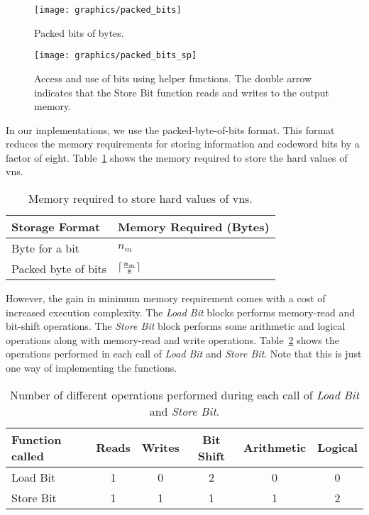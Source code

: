 \begin{enumerate}
  \begin{figure}[htbp]
    \centering
    \texttt{[image: graphics/packed\_bits]}
    \caption[Illustration of Packed-byte-of-bits storage format.]{Packed bits of bytes.}
    \label{fig:packed_bits}
  \end{figure}
  \begin{figure}[htbp]
    \centering
    \texttt{[image: graphics/packed\_bits\_sp]}
    \caption[Usage of bits stored in Packed-byte-of-bits format.]{Access and use of bits using helper functions. The double arrow indicates that the Store Bit function reads and writes to the output memory.}
    \label{fig:packed_spb}
  \end{figure}
\end{enumerate}
In our implementations, we use the packed-byte-of-bits format. This format reduces the memory requirements for storing information and codeword bits by a factor of eight. Table~\ref{tab:mem_req} shows the memory required to store the hard values of \glspl{vn}.
\begin{table}[htbp]
  \centering
  \begin{tabular}{|l|l|}
    \hline
    \textbf{Storage Format} &\textbf{Memory Required (Bytes)}\\
    \hline
    \hline
    Byte for a bit &$n_m$\\
    \hline
    Packed byte of bits &$\lceil\frac{n_m}{8}\rceil$\\
    \hline
  \end{tabular}
  \caption{Memory required to store hard values of \glspl{vn}.}
  \label{tab:mem_req}
\end{table}

However, the gain in minimum memory requirement comes with a cost of increased execution complexity. The \emph{Load Bit} blocks performs memory-read and bit-shift operations. The \emph{Store Bit} block performs some arithmetic and logical operations along with memory-read and write operations. Table~\ref{tab:load_store} shows the operations performed in each call of \emph{Load Bit} and \emph{Store Bit}. Note that this is just one way of implementing the functions.
\begin{table}[htbp]
  \centering
  \begin{tabular}{|l|c|c|c|c|c|}
    \hline
    \textbf{Function called} &\textbf{Reads} &\textbf{Writes} &\textbf{Bit Shift} &\textbf{Arithmetic} &\textbf{Logical}\\
    \hline
    \hline
    Load Bit &1 &0 &2 &0 &0\\
    \hline
    Store Bit &1 &1 &1 &1 &2\\
    \hline
  \end{tabular}
  \caption[Operations performed for different storage formats.]{Number of different operations performed during each call of \emph{Load Bit} and \emph{Store Bit}.}
  \label{tab:load_store}
\end{table}

